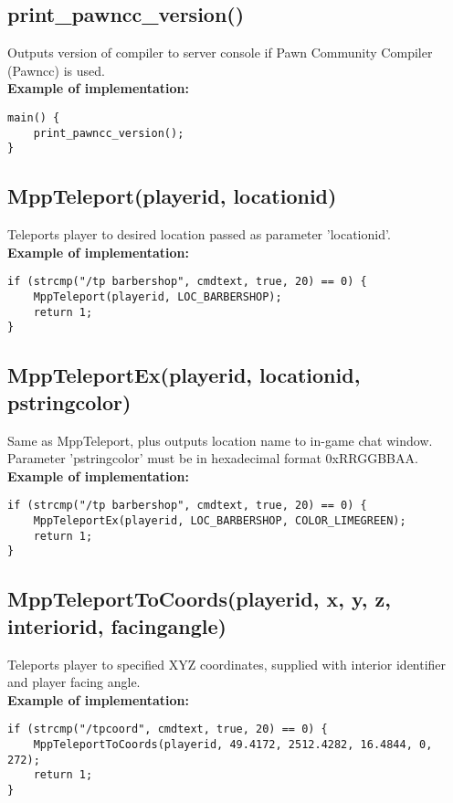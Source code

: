 \documentclass{article}
\begin{document}
\subsection{print\_pawncc\_version()}
Outputs version of compiler to server console if Pawn Community Compiler (Pawncc) is used.
\bigskip
\\\textbf{Example of implementation:}
\begin{verbatim}
main() {
    print_pawncc_version();
}
\end{verbatim}

\subsection{MppTeleport(playerid, locationid)}
Teleports player to desired location passed as parameter 'locationid'.
\bigskip
\\\textbf{Example of implementation:}
\begin{verbatim}
if (strcmp("/tp barbershop", cmdtext, true, 20) == 0) {
    MppTeleport(playerid, LOC_BARBERSHOP);
    return 1;
}
\end{verbatim}

\subsection{MppTeleportEx(playerid, locationid, pstringcolor)}
Same as MppTeleport, plus outputs location name to in-game chat window. \\Parameter 'pstringcolor' must be in hexadecimal format 0xRRGGBBAA.
\bigskip
\\\textbf{Example of implementation:}
\begin{verbatim}
if (strcmp("/tp barbershop", cmdtext, true, 20) == 0) {
    MppTeleportEx(playerid, LOC_BARBERSHOP, COLOR_LIMEGREEN);
    return 1;
}
\end{verbatim}

\subsection{MppTeleportToCoords(playerid, x, y, z, interiorid, facingangle)}
Teleports player to specified XYZ coordinates, supplied with interior identifier and player facing angle.
\bigskip
\\\textbf{Example of implementation:}
\begin{verbatim}
if (strcmp("/tpcoord", cmdtext, true, 20) == 0) {
    MppTeleportToCoords(playerid, 49.4172, 2512.4282, 16.4844, 0, 272);
    return 1;
}
\end{verbatim}
\end{document}
